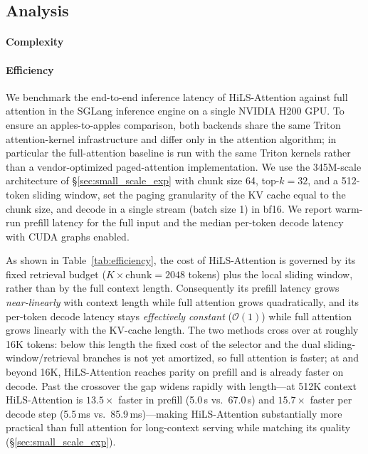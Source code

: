 





\subsection{Analysis}
\paragraph{Complexity}
\paragraph{Efficiency}
We benchmark the end-to-end inference latency of HiLS-Attention against full attention in the SGLang inference engine on a single NVIDIA H200 GPU. %
To ensure an apples-to-apples comparison, both backends share the same Triton attention-kernel infrastructure and differ only in the attention algorithm; in particular the full-attention baseline is run with the same Triton kernels rather than a vendor-optimized paged-attention implementation. We use the 345M-scale architecture of \S\ref{sec:small_scale_exp} with chunk size 64, top-$k=32$, and a 512-token sliding window, set the paging granularity of the KV cache equal to the chunk size, and decode in a single stream (batch size 1) in bf16. We report warm-run prefill latency for the full input and the median per-token decode latency with CUDA graphs enabled.



As shown in Table~\ref{tab:efficiency}, the cost of HiLS-Attention is governed by its fixed retrieval budget ($K\times\text{chunk}=2048$ tokens) plus the local sliding window, rather than by the full context length. Consequently its prefill latency grows \emph{near-linearly} with context length while full attention grows quadratically, and its per-token decode latency stays \emph{effectively constant} ($\mathcal{O}(1)$) while full attention grows linearly with the KV-cache length. The two methods cross over at roughly 16K tokens: below this length the fixed cost of the selector and the dual sliding-window/retrieval branches is not yet amortized, so full attention is faster; at and beyond 16K, HiLS-Attention reaches parity on prefill and is already faster on decode. Past the crossover the gap widens rapidly with length---at 512K context HiLS-Attention is $13.5\times$ faster in prefill (5.0\,s vs.\ 67.0\,s) and $15.7\times$ faster per decode step (5.5\,ms vs.\ 85.9\,ms)---making HiLS-Attention substantially more practical than full attention for long-context serving while matching its quality (\S\ref{sec:small_scale_exp}).


